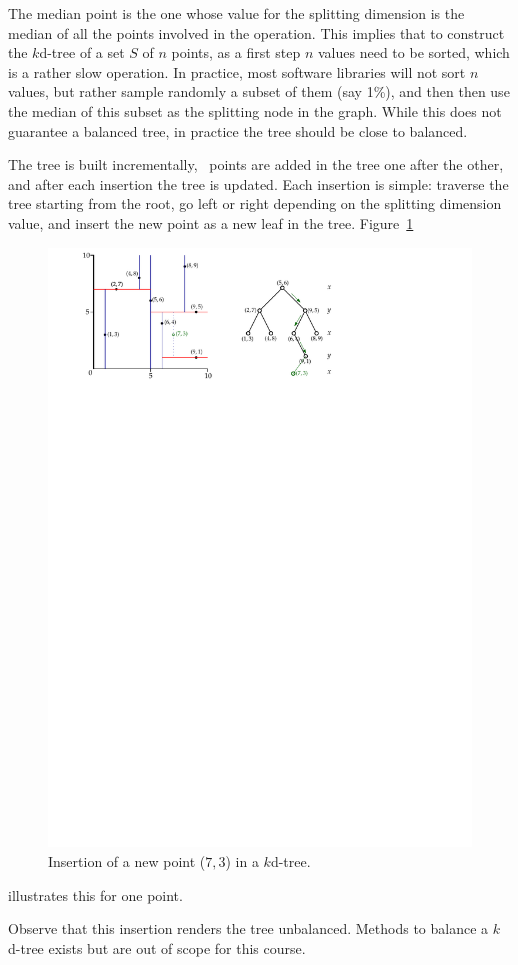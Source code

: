 The median point is the one whose value for the splitting dimension is the median of all the points involved in the operation.
This implies that to construct the $k$d-tree of a set $S$ of $n$ points, as a first step $n$ values need to be sorted, which is a rather slow operation.
In practice, most software libraries will not sort $n$ values, but rather sample randomly a subset of them (say 1\%), and then then use the median of this subset as the splitting node in the graph.
While this does not guarantee a balanced tree, in practice the tree should be close to balanced.

The tree is built incrementally, \ie\ points are added in the tree one after the other, and after each insertion the tree is updated.
Each insertion is simple: traverse the tree starting from the root, go left or right depending on the splitting dimension value, and insert the new point as a new leaf in the tree.
Figure~\ref{fig:kdtree_insert}
\begin{figure}[tbp]
  \centering
  \includegraphics[width=0.75\linewidth]{figs/kdtree_insert}
  \caption{Insertion of a new point ($7,3$) in a $k$d-tree.}
\label{fig:kdtree_insert}
\end{figure} 
illustrates this for one point.

Observe that this insertion renders the tree unbalanced.
Methods to balance a $k$d-tree exists but are out of scope for this course.



